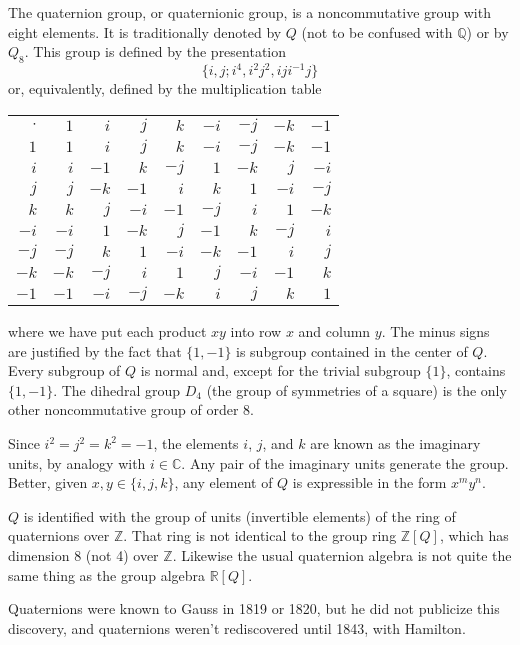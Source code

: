 \documentclass[12pt]{article}
\begin{document}
The quaternion group, or quaternionic group, is a noncommutative
group with eight elements. It is traditionally denoted by $Q$ (not to be
confused with $\mathbb{Q}$) or by $Q_8$. This group is defined by the
presentation
$$\{i,j;i^4,i^2j^2,iji^{-1}j\}$$
or, equivalently, defined by the multiplication table

\begin{center}
\begin{tabular}{rrrrrrrrr}\hline
$\cdot$& $1$  & $i$  & $j$  & $k$  & $-i$ & $-j$ & $-k$ & $-1$ \\
$1$    & $1$  & $i$  & $j$  & $k$  & $-i$ & $-j$ & $-k$ & $-1$ \\\hline
$i$    & $i$  & $-1$ & $k$  & $-j$ & $1$  & $-k$ & $j$  & $-i$ \\\hline
$j$    & $j$  & $-k$ & $-1$ & $i$  & $k$  & $1$  & $-i$ & $-j$ \\\hline
$k$    & $k$  & $j$  & $-i$ & $-1$ & $-j$ & $i$  & $1$  & $-k$ \\\hline
$-i$   & $-i$ & $1$  & $-k$ & $j$  & $-1$ & $k$  & $-j$ & $i$  \\\hline
$-j$   & $-j$ & $k$  & $1$  & $-i$ & $-k$ & $-1$ & $i$  & $j$  \\\hline
$-k$   & $-k$ & $-j$ & $i$  & $1$  & $j$  & $-i$ & $-1$ & $k$  \\\hline
$-1$   & $-1$ & $-i$ & $-j$ & $-k$ & $i$  & $j$  & $k$  & $1$\\\hline
\end{tabular}
\end{center}

\noindent
where we have put each product $xy$ into row $x$ and column $y$.
The minus signs are justified by the fact that $\{1,-1\}$ is subgroup
contained in the center of $Q$.
Every subgroup of $Q$ is normal and, except for
the trivial subgroup $\{1\}$, contains $\{1,-1\}$.
The dihedral group $D_4$ (the group of symmetries of a square) is the
only other noncommutative group of order 8.

Since $i^2 = j^2 = k^2 = -1$,
the elements $i$, $j$, and $k$ are known as the imaginary units, by
analogy with $i\in\mathbb{C}$. Any pair of the imaginary units generate
the group. Better, given $x,y\in\{i,j,k\}$, any element of $Q$
is expressible in the form $x^my^n$.

$Q$ is identified with the group of units (invertible elements) of the
ring of quaternions over $\mathbb{Z}$. That ring
is not identical to the group ring $\mathbb{Z}[Q]$, which has dimension 8
(not 4) over $\mathbb{Z}$. Likewise the usual quaternion algebra
is not quite the same thing as the group algebra $\mathbb{R}[Q]$.

Quaternions were known to Gauss in 1819 or 1820, but he did not
publicize this discovery, and quaternions weren't rediscovered until
1843, with Hamilton. 
\end{document}
